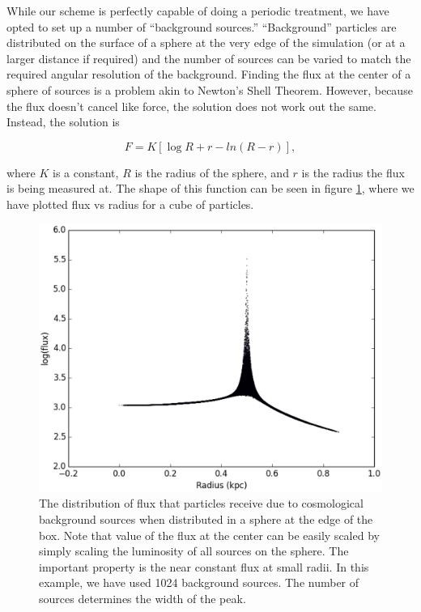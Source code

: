 While our scheme is perfectly capable of doing a periodic treatment, we have opted to set up a number of ``background sources.'' ``Background'' particles are distributed on the surface of a sphere at the very edge of the simulation (or at a larger distance if required) and the number of sources can be varied to match the required angular resolution of the background. Finding the flux at the center of a sphere of sources is a problem akin to Newton's Shell Theorem. However, because the flux doesn't cancel like force, the solution does not work out the same. Instead, the solution is

\begin{equation}
\label{eq:shellflux}
F = K\left[ \log{R+r} - ln(R-r) \right],
\end{equation}

\noindent
where $K$ is a constant, $R$ is the radius of the sphere, and $r$ is the radius the flux is being measured at. The shape of this function can be seen in figure \ref{fig:backgroundflux}, where we have plotted flux vs radius for a cube of particles.

\begin{figure}
\includegraphics[width=\textwidth]{graphics/backgroundflux.eps}
\caption[Flux due to the cosmological background.]{The distribution of flux that particles receive due to cosmological background sources when distributed in a sphere at the edge of the box. Note that value of the flux at the center can be easily scaled by simply scaling the luminosity of all sources on the sphere. The important property is the near constant flux at small radii. In this example, we have used 1024 background sources. The number of sources determines the width of the peak.}
\label{fig:backgroundflux}
\end{figure}

